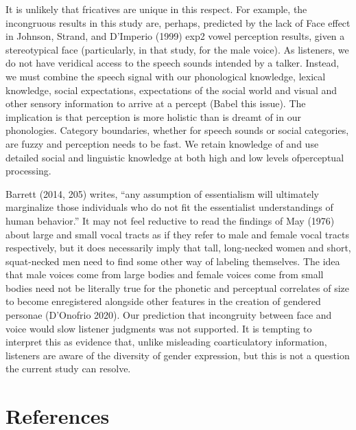 \documentclass[
  letterpaper,
  DIV=11,
  numbers=noendperiod]{scrartcl}
\begin{document}
It is unlikely that fricatives are unique in this respect. For example,
the incongruous results in this study are, perhaps, predicted by the
lack of Face effect in Johnson, Strand, and D'Imperio (1999) exp2 vowel
perception results, given a stereotypical face (particularly, in that
study, for the male voice). As listeners, we do not have veridical
access to the speech sounds intended by a talker. Instead, we must
combine the speech signal with our phonological knowledge, lexical
knowledge, social expectations, expectations of the social world and
visual and other sensory information to arrive at a percept (Babel this
issue). The implication is that perception is more holistic than is
dreamt of in our phonologies. Category boundaries, whether for speech
sounds or social categories, are fuzzy and perception needs to be fast.
We retain knowledge of and use detailed social and linguistic knowledge
at both high and low levels ofperceptual processing.

Barrett (2014, 205) writes, ``any assumption of essentialism will
ultimately marginalize those individuals who do not fit the essentialist
understandings of human behavior.'' It may not feel reductive to read
the findings of May (1976) about large and small vocal tracts as if they
refer to male and female vocal tracts respectively, but it does
necessarily imply that tall, long-necked women and short, squat-necked
men need to find some other way of labeling themselves. The idea that
male voices come from large bodies and female voices come from small
bodies need not be literally true for the phonetic and perceptual
correlates of size to become enregistered alongside other features in
the creation of gendered personae (D'Onofrio 2020). Our prediction that
incongruity between face and voice would slow listener judgments was not
supported. It is tempting to interpret this as evidence that, unlike
misleading coarticulatory information, listeners are aware of the
diversity of gender expression, but this is not a question the current
study can resolve.

\section*{References}\label{sec-references}
\end{document}
